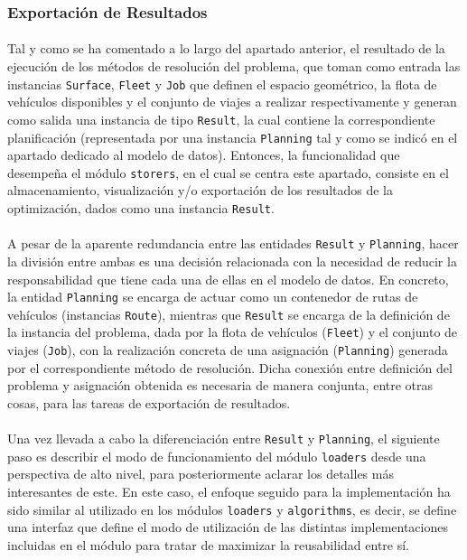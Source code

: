 \documentclass{subfiles}
\begin{document}
        \subsubsection{Exportación de Resultados}
        \label{sec:implementation_components_exportation}

          \paragraph{}
          Tal y como se ha comentado a lo largo del apartado anterior, el resultado de la ejecución de los métodos de resolución del problema, que toman como entrada las instancias \texttt{Surface}, \texttt{Fleet} y \texttt{Job} que definen el espacio geométrico, la flota de vehículos disponibles y el conjunto de viajes a realizar respectivamente y generan como salida una instancia de tipo \texttt{Result}, la cual contiene la correspondiente planificación (representada por una instancia \texttt{Planning} tal y como se indicó en el apartado dedicado al modelo de datos). Entonces, la funcionalidad que desempeña el módulo \texttt{storers}, en el cual se centra este apartado, consiste en el almacenamiento, visualización y/o exportación de los resultados de la optimización, dados como una instancia \texttt{Result}.

          \paragraph{}
          A pesar de la aparente redundancia entre las entidades \texttt{Result} y \texttt{Planning}, hacer la división entre ambas es una decisión relacionada con la necesidad de reducir la responsabilidad que tiene cada una de ellas en el modelo de datos. En concreto, la entidad \texttt{Planning} se encarga de actuar como un contenedor de rutas de vehículos (instancias \texttt{Route}), mientras que \texttt{Result} se encarga de  la definición de la instancia del problema, dada por la flota de vehículos (\texttt{Fleet}) y el conjunto de viajes (\texttt{Job}), con la realización concreta de una asignación (\texttt{Planning}) generada por el correspondiente método de resolución. Dicha conexión entre definición del problema y asignación obtenida es necesaria de manera conjunta, entre otras cosas, para las tareas de exportación de resultados.
          
          \paragraph{}
          Una vez llevada a cabo la diferenciación entre \texttt{Result} y \texttt{Planning}, el siguiente paso es describir el modo de funcionamiento del módulo \texttt{loaders} desde una perspectiva de alto nivel, para posteriormente aclarar los detalles más interesantes de este. En este caso, el enfoque seguido para la implementación ha sido similar al utilizado en los módulos \texttt{loaders} y \texttt{algorithms}, es decir, se define una interfaz que define el modo de utilización de las distintas implementaciones incluidas en el módulo para tratar de maximizar la reusabilidad entre sí. 
\end{document}
